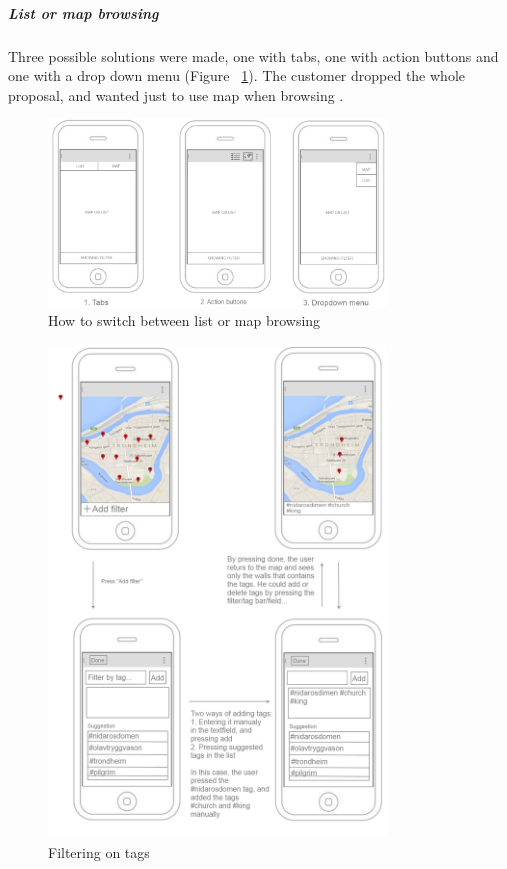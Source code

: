 \documentclass[11pt]{book}
\begin{document}
\subparagraph{List or map browsing}
Three possible solutions were made, one with tabs, one with action buttons and one with a drop down menu (Figure ~\ref{fig:phases_sprint1_uiVersionTwoAccessListOrMap}). The customer dropped the whole proposal, and wanted just to use map when browsing \wallentityp.

\begin{figure}[H]
    \centering
    \includegraphics[width=0.8\textwidth]{Figures/Phases/Sprint1/accessListOrMap.png}
    \caption{How to switch between list or map browsing}
    \label{fig:phases_sprint1_uiVersionTwoAccessListOrMap}
\end{figure}

\begin{figure}[H]
    \centering
    \includegraphics[width=0.8\textwidth]{Figures/Phases/Sprint1/addFilter.png}
    \caption{Filtering on tags}
    \label{fig:phases_sprint1_uiVersionTwoAddFilter}
\end{figure}
\end{document}
